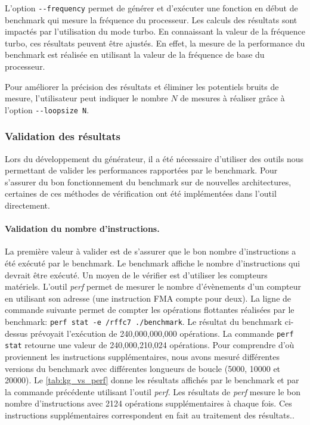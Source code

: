             L'option \verb|--frequency| permet de générer et d'exécuter une fonction en début de benchmark qui mesure la fréquence du processeur. Les calculs des résultats sont impactés par l'utilisation du mode turbo. En connaissant la valeur de la fréquence turbo, ces résultats peuvent être ajustés. En effet, la mesure de la performance du benchmark est réalisée en utilisant la valeur de la fréquence de base du processeur. 
            
            Pour améliorer la précision des résultats et éliminer les potentiels bruits de mesure, l'utilisateur peut indiquer le nombre $N$ de mesures à réaliser grâce à l'option \verb|--loopsize N|.    
    
    
    \subsubsection{Validation des résultats}
    
        Lors du développement du générateur, il a été nécessaire d'utiliser des outils nous permettant de valider les performances rapportées par le benchmark. Pour s'assurer du bon fonctionnement du benchmark sur de nouvelles architectures, certaines de ces méthodes de vérification ont été implémentées dans l'outil directement. 
        
        
        \paragraph{Validation du nombre d'instructions.} La première valeur à valider est de s'assurer que le bon nombre d'instructions a été exécuté par le benchmark. Le benchmark affiche le nombre d'instructions qui devrait être exécuté. Un moyen de le vérifier est d'utiliser les compteurs matériels. L'outil \textit{perf} permet de mesurer le nombre d'évènements d'un compteur en utilisant son adresse (une instruction FMA compte pour deux). La ligne de commande suivante permet de compter les opérations flottantes réalisées par le benchmark: \verb|perf stat -e /rffc7 ./benchmark|. Le résultat du benchmark ci-dessus prévoyait l'exécution de 240,000,000,000 opérations. La commande \verb|perf stat| retourne une valeur de 240,000,210,024 opérations. Pour comprendre d'où proviennent les instructions supplémentaires, nous avons mesuré différentes versions du benchmark avec différentes longueurs de boucle (5000, 10000 et 20000). Le \autoref{tab:kg_vs_perf} donne les résultats affichés par le benchmark et par la commande précédente utilisant l'outil \textit{perf}. Les résultats de \textit{perf} mesure le bon nombre d'instructions avec 2124 opérations supplémentaires à chaque fois. Ces instructions supplémentaires correspondent en fait au traitement des résultats..
    
